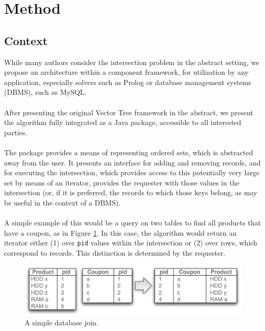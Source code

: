 \documentclass[11pt,letterpaper]{article}
\begin{document}

\section{Method}

\subsection{Context}
While many authors consider the intersection problem in the abstract setting,
we propose an architecture within a component framework, for utilization by
any application, especially solvers such as Prolog or database management
systems (DBMS), such as MySQL.

\paragraph{}
After presenting the original Vector Tree framework in the abstract, we present 
the algorithm fully integrated as a Java package, accessible to all interested parties.

\paragraph{}
The package provides a means of representing ordered sets, which is abstracted
away from the user.  It presents an interface for adding and removing records,
and for executing the intersection, which provides access to this potentially very
large set by means of an iterator, provides the requester with those values in the
intersection (or, if it is preferred, the records to which those keys belong, as may
be useful in the context of a DBMS).

\paragraph{}
A simple example of this would be a query on two tables to find all products that
have a coupon, as in Figure \ref{fig:db-join}. In this case, the algorithm would return
an iterator either (1) over {\tt pid} values within the intersection or (2) over rows,
which correspond to records.  This distinction is determined by the requester.

\begin{figure}[t]
\center
\includegraphics[width=0.98\linewidth]{db-join.pdf}
\caption{A simple database join.}
\label{fig:db-join}
\end{figure}
\end{document}
